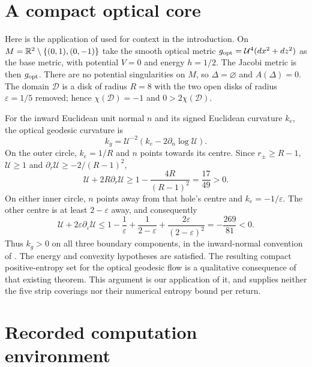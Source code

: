 \appendix
\section{A compact optical core}\label{app:core}

Here is the application of \cite[Theorem 2.1]{BK} used for context in the
introduction. On $M=\mathbb R^2\setminus\{(0,1),(0,-1)\}$ take the smooth optical
metric $g_{\rm opt}=\mathcal U^4(dx^2+dz^2)$ as the base metric, with
potential $V=0$ and energy $h=1/2$. The Jacobi metric is then $g_{\rm opt}$.
There are no potential singularities on $M$, so $\Delta=\varnothing$ and
$A(\Delta)=0$. The domain $\mathcal D$ is a disk of radius $R=8$ with the
two open disks of radius $\varepsilon=1/5$ removed; hence
$\chi(\mathcal D)=-1$ and $0>2\chi(\mathcal D)$.

For the inward Euclidean unit normal $n$ and its signed Euclidean curvature
$k_e$, the optical geodesic curvature is
\[
 k_g=\mathcal U^{-2}(k_e-2\partial_n\log\mathcal U).
\]
On the outer circle, $k_e=1/R$ and $n$ points towards its centre. Since
$r_\pm\geq R-1$, $\mathcal U\geq1$ and
$\partial_r\mathcal U\geq-2/(R-1)^2$,
\[
 \mathcal U+2R\partial_r\mathcal U
 \geq1-\frac{4R}{(R-1)^2}=\frac{17}{49}>0.
\]
On either inner circle, $n$ points away from that hole's centre and
$k_e=-1/\varepsilon$. The other centre is at least $2-\varepsilon$ away,
and consequently
\[
 \mathcal U+2\varepsilon\partial_\varepsilon\mathcal U
 \leq 1-\frac1\varepsilon+\frac1{2-\varepsilon}
       +\frac{2\varepsilon}{(2-\varepsilon)^2}
 =-\frac{269}{81}<0.
\]
Thus $k_g>0$ on all three boundary components, in the inward-normal
convention of \cite{BK}. The energy and convexity hypotheses are satisfied.
The resulting compact positive-entropy set for the optical geodesic flow
is a qualitative consequence of that existing theorem. This argument is
our application of it, and supplies neither the five strip coverings nor
their numerical entropy bound per return.

\section{Recorded computation environment}\label{app:environment}

